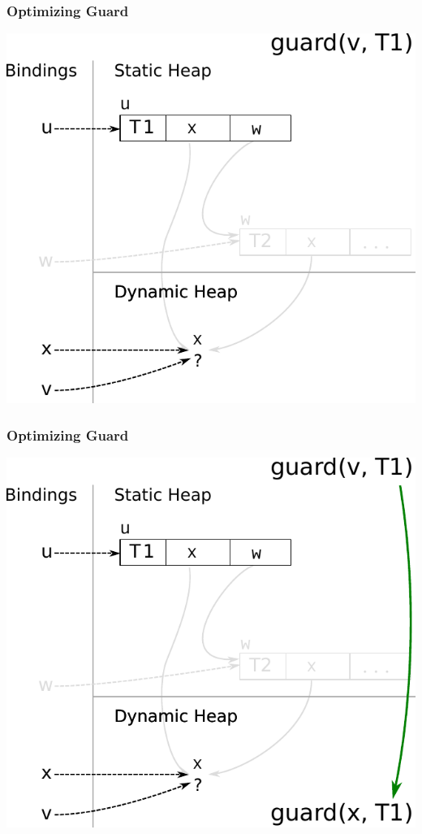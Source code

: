 \documentclass[utf8x]{beamer}
\begin{document}
\begin{frame}[plain]
  \frametitle{Optimizing Guard}
  \includegraphics[scale=0.8]{figures/opt_guard3}
\end{frame}

\begin{frame}[plain]
  \frametitle{Optimizing Guard}
  \includegraphics[scale=0.8]{figures/opt_guard4}
\end{frame}
\end{document}
